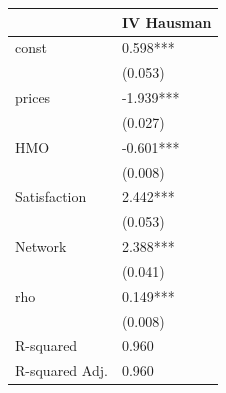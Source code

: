 \begin{tabular}{ll}
\hline
               & IV Hausman  \\
\hline
const          & 0.598***    \\
               & (0.053)     \\
prices         & -1.939***   \\
               & (0.027)     \\
HMO            & -0.601***   \\
               & (0.008)     \\
Satisfaction   & 2.442***    \\
               & (0.053)     \\
Network        & 2.388***    \\
               & (0.041)     \\
rho            & 0.149***    \\
               & (0.008)     \\
R-squared      & 0.960       \\
R-squared Adj. & 0.960       \\
\hline
\end{tabular}
